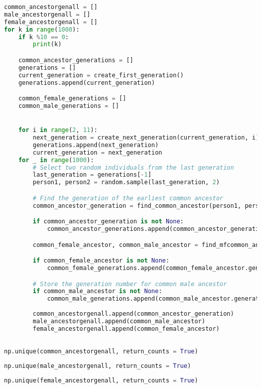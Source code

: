 \begin{lstlisting}[language=Python]

\end{lstlisting}
\begin{lstlisting}[language=Python]
common_ancestorgenall = []
male_ancestorgenall = []
female_ancestorgenall = []
for k in range(1000):
    if k %10 == 0:
        print(k)

    common_ancestor_generations = []
    generations = []
    current_generation = create_first_generation()
    generations.append(current_generation)

    common_female_generations = []
    common_male_generations = []


    for i in range(2, 11):
        next_generation = create_next_generation(current_generation, i)
        generations.append(next_generation)
        current_generation = next_generation
    for _ in range(1000):
        # Select two random individuals from the last generation
        last_generation = generations[-1]
        person1, person2 = random.sample(last_generation, 2)

        # Find the generation of the earliest common ancestor
        common_ancestor_generation = find_common_ancestor(person1, person2)

        if common_ancestor_generation is not None:
            common_ancestor_generations.append(common_ancestor_generation)

        common_female_ancestor, common_male_ancestor = find_mfcommon_ancestor(person1, person2)

        if common_female_ancestor is not None:
            common_female_generations.append(common_female_ancestor.generation)

        # Store the generation number for common male ancestor
        if common_male_ancestor is not None:
            common_male_generations.append(common_male_ancestor.generation)
            
        common_ancestorgenall.append(common_ancestor_generation)
        male_ancestorgenall.append(common_male_ancestor)
        female_ancestorgenall.append(common_female_ancestor)



\end{lstlisting}
\begin{lstlisting}[language=Python]
np.unique(common_ancestorgenall, return_counts = True)
\end{lstlisting}
\begin{lstlisting}[language=Python]
np.unique(male_ancestorgenall, return_counts = True)
\end{lstlisting}
\begin{lstlisting}[language=Python]
np.unique(female_ancestorgenall, return_counts = True)
\end{lstlisting}
